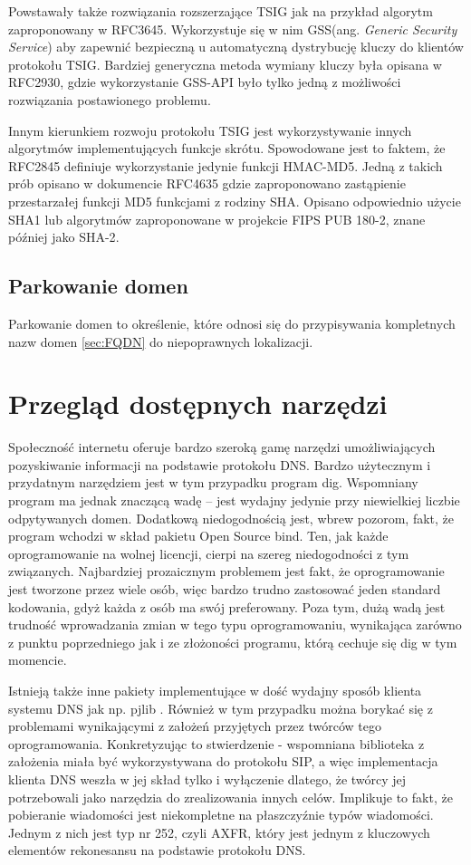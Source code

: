 Powstawały także rozwiązania rozszerzające TSIG jak na przykład algorytm zaproponowany w RFC3645\cite{RFC3645}. Wykorzystuje się w nim GSS\cite{RFC2743}(ang. \textit{Generic Security Service}) aby zapewnić bezpieczną u automatyczną dystrybucję kluczy do klientów protokołu TSIG. Bardziej generyczna metoda wymiany kluczy była opisana w RFC2930\cite{RFC2930}, gdzie wykorzystanie GSS-API było tylko jedną z możliwości rozwiązania postawionego problemu.

Innym kierunkiem rozwoju protokołu TSIG jest wykorzystywanie innych algorytmów implementujących funkcje skrótu. Spowodowane jest to faktem, że RFC2845\cite{RFC2845} definiuje wykorzystanie jedynie funkcji HMAC-MD5. Jedną z takich prób opisano w dokumencie RFC4635\cite{RFC4635} gdzie zaproponowano zastąpienie przestarzałej funkcji MD5 funkcjami z rodziny SHA. Opisano odpowiednio użycie SHA1\cite{RFC3174} lub algorytmów zaproponowane w projekcie FIPS PUB 180-2, znane później jako SHA-2\cite{RFC4634}.

\section{Parkowanie domen}
Parkowanie domen to określenie, które odnosi się do przypisywania kompletnych nazw domen \ref{sec:FQDN} do niepoprawnych lokalizacji.


\chapter{Przegląd dostępnych narzędzi}
Społeczność internetu oferuje bardzo szeroką gamę narzędzi umożliwiających pozyskiwanie informacji na podstawie protokołu DNS. Bardzo użytecznym i przydatnym narzędziem jest w tym przypadku program dig. Wspomniany program ma jednak znaczącą wadę -- jest wydajny jedynie przy niewielkiej liczbie odpytywanych domen. Dodatkową niedogodnością jest, wbrew pozorom, fakt, że program wchodzi w skład pakietu Open Source bind. Ten, jak każde oprogramowanie na wolnej licencji, cierpi na szereg niedogodności z tym związanych. Najbardziej prozaicznym problemem jest fakt, że oprogramowanie jest tworzone przez wiele osób, więc bardzo trudno zastosować jeden standard kodowania, gdyż każda z osób ma swój preferowany. Poza tym, dużą wadą jest trudność wprowadzania zmian w tego typu oprogramowaniu, wynikająca zarówno z punktu poprzedniego jak i ze złożoności programu, którą cechuje się dig w tym momencie.

Istnieją także inne pakiety implementujące w dość wydajny sposób klienta systemu DNS jak np. pjlib \cite{pjlib}. Również w tym przypadku można borykać się z problemami wynikającymi z założeń przyjętych przez twórców tego oprogramowania. Konkretyzując to stwierdzenie - wspomniana biblioteka z założenia miała być wykorzystywana do protokołu SIP, a więc implementacja klienta DNS weszła w jej skład tylko i wyłączenie dlatego, że twórcy jej potrzebowali jako narzędzia do zrealizowania innych celów. Implikuje to fakt, że pobieranie wiadomości jest niekompletne na płaszczyźnie typów wiadomości. Jednym z nich jest typ nr 252, czyli AXFR, który jest jednym z kluczowych elementów rekonesansu na podstawie protokołu DNS.
